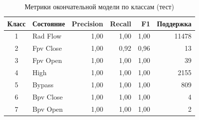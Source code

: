 \begin{table}[H]
\centering
\small
\caption{Метрики окончательной модели по классам (тест)}\label{tab:class}
\begin{tabular}{clrrrr}
\toprule
Класс & Состояние & Precision & Recall & F1 & Поддержка \\
\midrule
1 & Rad Flow & 1,00 & 1,00 & 1,00 & 11478 \\
2 & Fpv Close & 1,00 & 0,92 & 0,96 & 13 \\
3 & Fpv Open & 1,00 & 1,00 & 1,00 & 39 \\
4 & High & 1,00 & 1,00 & 1,00 & 2155 \\
5 & Bypass & 1,00 & 1,00 & 1,00 & 809 \\
6 & Bpv Close & 1,00 & 1,00 & 1,00 & 4 \\
7 & Bpv Open & 1,00 & 1,00 & 1,00 & 2 \\
\bottomrule
\end{tabular}
\end{table}
